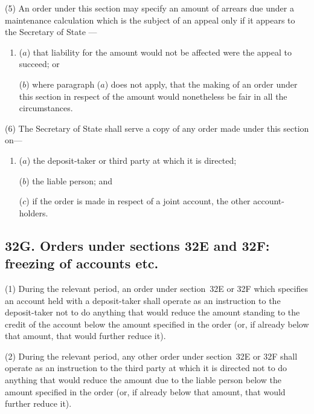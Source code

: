 \documentclass[12pt,a4paper]{article}
\begin{document}
(5)
An order under this section may specify an amount of arrears due under a maintenance calculation which is the subject of an appeal only if it appears to the 
Secretary of State%
---
\begin{enumerate}\item[]
($a$) that liability for the amount would not be affected were the appeal to succeed; or

($b$) where paragraph ($a$) does not apply, that the making of an order under this section in respect of the amount would nonetheless be fair in all the circumstances.
\end{enumerate}

(6) The 
Secretary of State  %
shall serve a copy of any order made under this section on---
\begin{enumerate}\item[]
($a$) the deposit-taker or third party at which it is directed;

($b$) the liable person; and

($c$) if the order is made in respect of a joint account, the other account-holders.
\end{enumerate}


\subsection{32G. Orders under sections 32E and 32F: freezing of accounts etc.}

(1) During the relevant period, an order under section~32E or 32F which
specifies an account held with a deposit-taker shall operate as an instruction to the deposit-taker not to do anything that would reduce the amount standing to the credit of the account below the amount specified in the order (or, if already below that amount, that would further reduce it).

(2)
During the relevant period, any other order under section~32E or 32F shall operate as an instruction to the third party at which it is directed not to do anything that would reduce the amount due to the liable person below the amount specified in the order (or, if already below that amount, that would further reduce it).
\end{document}
